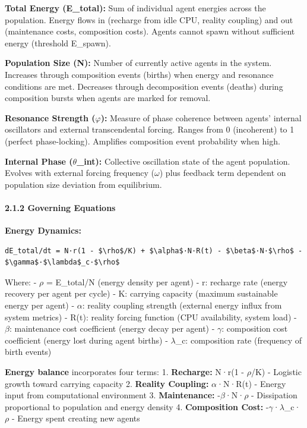 \documentclass[
]{article}
\begin{document}
\textbf{Total Energy (E\_total):} Sum of individual agent energies
across the population. Energy flows in (recharge from idle CPU, reality
coupling) and out (maintenance costs, composition costs). Agents cannot
spawn without sufficient energy (threshold E\_spawn).

\textbf{Population Size (N):} Number of currently active agents in the
system. Increases through composition events (births) when energy and
resonance conditions are met. Decreases through decomposition events
(deaths) during composition bursts when agents are marked for removal.

\textbf{Resonance Strength ($\varphi$):} Measure of phase coherence between
agents' internal oscillators and external transcendental forcing. Ranges
from 0 (incoherent) to 1 (perfect phase-locking). Amplifies composition
event probability when high.

\textbf{Internal Phase ($\theta$\_int):} Collective oscillation state of the
agent population. Evolves with external forcing frequency ($\omega$) plus
feedback term dependent on population size deviation from equilibrium.

\paragraph{2.1.2 Governing Equations}\label{governing-equations}

\textbf{Energy Dynamics:}

\begin{verbatim}
dE_total/dt = N·r(1 - $\rho$/K) + $\alpha$·N·R(t) - $\beta$·N·$\rho$ - $\gamma$·$\lambda$_c·$\rho$
\end{verbatim}

Where: - $\rho$ = E\_total/N (energy density per agent) - r: recharge rate
(energy recovery per agent per cycle) - K: carrying capacity (maximum
sustainable energy per agent) - $\alpha$: reality coupling strength (external
energy influx from system metrics) - R(t): reality forcing function (CPU
availability, system load) - $\beta$: maintenance cost coefficient (energy
decay per agent) - $\gamma$: composition cost coefficient (energy lost during
agent births) - $\lambda$\_c: composition rate (frequency of birth events)

\textbf{Energy balance} incorporates four terms: 1. \textbf{Recharge:}
N·r(1 - $\rho$/K) - Logistic growth toward carrying capacity 2.
\textbf{Reality Coupling:} $\alpha$·N·R(t) - Energy input from computational
environment 3. \textbf{Maintenance:} -$\beta$·N·$\rho$ - Dissipation proportional
to population and energy density 4. \textbf{Composition Cost:} -$\gamma$·$\lambda$\_c·$\rho$
- Energy spent creating new agents
\end{document}
